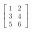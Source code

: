 \documentclass[preview]{standalone}
\begin{document}
\begin{align*}
\begin{bmatrix} 1 & 2 \\ 3 & 4 \\ 5 & 6 \end{bmatrix}
\end{align*}
\end{document}
